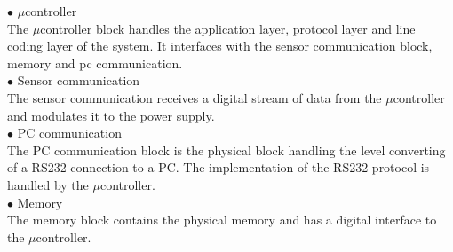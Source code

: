 \hspace*{.6cm}$\bullet$ $\mu$controller\\
The $\mu$controller block handles the application layer, protocol layer and line coding layer of the system. It interfaces with the sensor communication block, memory and pc communication.\\
\hspace*{.6cm}$\bullet$ Sensor communication\\
The sensor communication receives a digital stream of data from the $\mu$controller and modulates it to the power supply.\\
\hspace*{.6cm}$\bullet$ PC communication\\
The PC communication block is the physical block handling the level converting of a RS232 connection to a PC. The implementation of the RS232 protocol is handled by the $\mu$controller.\\
\hspace*{.6cm}$\bullet$ Memory\\
The memory block contains the physical memory and has a digital interface to the $\mu$controller.

